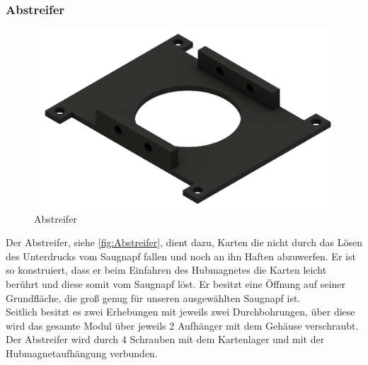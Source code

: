 \subsubsection{Abstreifer}
\begin{figure}
    \includegraphics[width=8 cm]{fig/mech/Abstreifer}
    \caption{Abstreifer}
    \label{fig:Abstreifer}
\end{figure}
Der Abstreifer, siehe \autoref{fig:Abstreifer}, dient dazu, Karten die nicht durch das Lösen des Unterdrucks vom Saugnapf fallen und noch an ihn Haften
abzuwerfen. Er ist so konstruiert, dass er beim Einfahren des Hubmagnetes die Karten leicht berührt und diese somit vom
Saugnapf löst. Er besitzt eine Öffnung auf seiner Grundfläche, die groß genug für unseren ausgewählten Saugnapf ist.\\
Seitlich besitzt es zwei Erhebungen mit jeweils zwei Durchbohrungen, über diese wird das gesamte Modul über jeweils 2 Aufhänger
mit dem Gehäuse verschraubt. \\
Der Abstreifer wird durch 4 Schrauben mit dem Kartenlager und mit der Hubmagnetaufhängung  verbunden.



